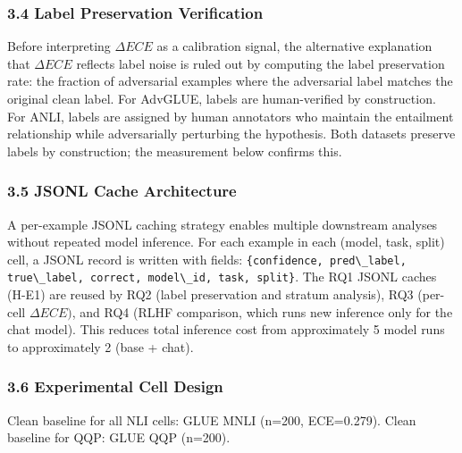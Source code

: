\subsubsection{3.4 Label Preservation Verification}

Before interpreting $\Delta ECE$ as a calibration signal, the alternative explanation that $\Delta ECE$ reflects label noise is ruled out by computing the label preservation rate: the fraction of adversarial examples where the adversarial label matches the original clean label. For AdvGLUE, labels are human-verified by construction. For ANLI, labels are assigned by human annotators who maintain the entailment relationship while adversarially perturbing the hypothesis. Both datasets preserve labels by construction; the measurement below confirms this.

\subsubsection{3.5 JSONL Cache Architecture}

A per-example JSONL caching strategy enables multiple downstream analyses without repeated model inference. For each example in each (model, task, split) cell, a JSONL record is written with fields: \texttt{\{confidence, pred\textbackslash \_label, true\textbackslash \_label, correct, model\textbackslash \_id, task, split\}}. The RQ1 JSONL caches (H-E1) are reused by RQ2 (label preservation and stratum analysis), RQ3 (per-cell $\Delta ECE)$, and RQ4 (RLHF comparison, which runs new inference only for the chat model). This reduces total inference cost from approximately 5 model runs to approximately 2 (base + chat).

\subsubsection{3.6 Experimental Cell Design}

\begin{table}[htbp]
\centering
{}
\end{table}

Clean baseline for all NLI cells: GLUE MNLI (n=200, ECE=0.279). Clean baseline for QQP: GLUE QQP (n=200).

